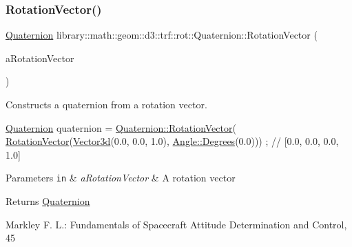 \subsubsection{\texorpdfstring{Rotation\+Vector()}{RotationVector()}}
{\footnotesize\ttfamily \hyperlink{classlibrary_1_1math_1_1geom_1_1d3_1_1trf_1_1rot_1_1_quaternion}{Quaternion} library\+::math\+::geom\+::d3\+::trf\+::rot\+::\+Quaternion\+::\+Rotation\+Vector (\begin{DoxyParamCaption}\item[{const \hyperlink{classlibrary_1_1math_1_1geom_1_1d3_1_1trf_1_1rot_1_1_rotation_vector}{rot\+::\+Rotation\+Vector} \&}]{a\+Rotation\+Vector }\end{DoxyParamCaption})\hspace{0.3cm}{\ttfamily [static]}}



Constructs a quaternion from a rotation vector. 


\begin{DoxyCode}
\hyperlink{classlibrary_1_1math_1_1geom_1_1d3_1_1trf_1_1rot_1_1_quaternion_a1b8794cce68c5ee86dd50f9ba53635fa}{Quaternion} quaternion = \hyperlink{classlibrary_1_1math_1_1geom_1_1d3_1_1trf_1_1rot_1_1_quaternion_a9e9bdb58d7c344ad3fc3b82d5b4fcd0a}{Quaternion::RotationVector}(
      \hyperlink{classlibrary_1_1math_1_1geom_1_1d3_1_1trf_1_1rot_1_1_quaternion_a9e9bdb58d7c344ad3fc3b82d5b4fcd0a}{RotationVector}(\hyperlink{namespacelibrary_1_1math_1_1obj_a977e84e9bf317a4e7dd9d6d671d6da2f}{Vector3d}(0.0, 0.0, 1.0), \hyperlink{classlibrary_1_1math_1_1geom_1_1_angle_a64aa53e8420aeb6f671d86c65c370bc8}{Angle::Degrees}(0.0))) ; \textcolor{comment}{//
       [0.0, 0.0, 0.0, 1.0]}
\end{DoxyCode}



\begin{DoxyParams}[1]{Parameters}
\mbox{\tt in}  & {\em a\+Rotation\+Vector} & A rotation vector \\
\hline
\end{DoxyParams}
\begin{DoxyReturn}{Returns}
\hyperlink{classlibrary_1_1math_1_1geom_1_1d3_1_1trf_1_1rot_1_1_quaternion}{Quaternion} 
\end{DoxyReturn}
Markley F. L.\+: Fundamentals of Spacecraft Attitude Determination and Control, 45 \mbox{\label{classlibrary_1_1math_1_1geom_1_1d3_1_1trf_1_1rot_1_1_quaternion_a9dd9ab9d3e3474d5a7dd038bb4160a94}} 
